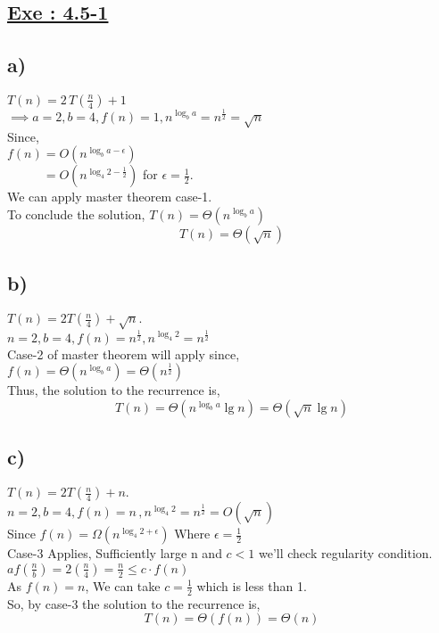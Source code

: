 \documentclass[a4paper, 11pt]{article}
\begin{document}
\subsection*{\underline{Exe : 4.5-1}}
\subsection*{a)}
$T(n) = 2\,T(\frac{n}{4}) +1 $ \\
$\implies a=2, b=4, f(n) = 1 , n^{\log_{b}a} = n^{\frac{1}{2}} = \sqrt{n}$ \\
Since,\\
$f(n) = O(n^{\log_{b}a - \epsilon})$\\
$\phantom{f(n)} = O(n^{\log_{4}2 - \frac{1}{2}})$ for $ \epsilon = \frac{1}{2}.$\\
We can apply master theorem case-1.\\
To conclude the solution, $T(n) = \Theta(n^{\log_{b}a})$
$$T(n) = \Theta (\sqrt{n})$$

\subsection*{b)}
$T(n) = 2T(\frac{n}{4}) + \sqrt{n}.$\\
$ n=2, b=4, f(n)=n^{\frac{1}{2}},n^{\log_{4}2}=n^{\frac{1}{2}} $\\
Case-2 of master theorem will apply since,\\
$f(n)= \Theta(n^{\log_{b}a}) = \Theta (n^{\frac{1}{2}})$\\
Thus, the solution to the recurrence is,
$$T(n) = \Theta(n^{\log_{b}a}\lg n) = \Theta(\sqrt{n}\lg n)$$

\subsection*{c)}
$T(n) = 2T(\frac{n}{4}) + n .$\\
$ n=2, b=4, f(n)=n \, ,n^{\log_{4}2}=n^{\frac{1}{2}} = O(\sqrt{n}) $\\
Since $f(n) = \Omega(n^{\log_{4}2 + \epsilon})$ Where $\epsilon=\frac{1}{2}$\\
Case-3 Applies, Sufficiently large n and $c<1$ we'll check regularity condition.\\
$af(\frac{n}{b}) = 2(\frac{n}{4}) = \frac{n}{2} \le c \cdot f(n)$\\
As $f(n)=n$, We can take $c=\frac{1}{2}$ which is less than 1.\\
So, by case-3 the solution to the recurrence is,
$$T(n) = \Theta (f(n)) = \Theta(n)$$
\end{document}
